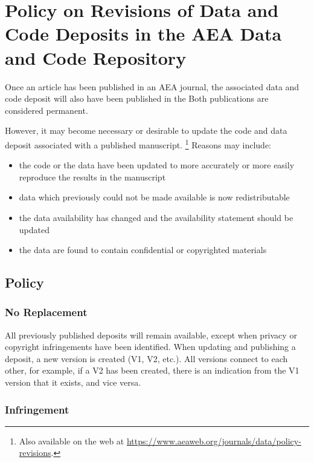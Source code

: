 \section{Policy on Revisions of Data and Code Deposits in the AEA Data and Code Repository}\label{policy-on-revisions-of-data-and-code-deposits-in-the-aea-data-and-code-repository}

Once an article has been published in an AEA journal, the associated
data and code deposit will also have been published in the
 Both publications are considered permanent.

However, it may become necessary or desirable to update the code and
data deposit associated with a published manuscript.%
\footnote{Also available on the web at \url{https://www.aeaweb.org/journals/data/policy-revisions}.} 
Reasons may
include:

\begin{itemize}
\tightlist
\item
  the code or the data have been updated to more accurately or more
  easily reproduce the results in the manuscript
\item
  data which previously could not be made available is now
  redistributable
\item
  the data availability has changed and the availability statement
  should be updated
\item
  the data are found to contain confidential or copyrighted materials
\end{itemize}

\subsection{Policy}\label{policy}

\subsubsection{No Replacement}\label{no-replacement}

All previously published deposits will remain available, except when
privacy or copyright infringements have been identified. When updating
and publishing a deposit, a new version is created (V1, V2, etc.). All
versions connect to each other, for example, if a V2 has been created,
there is an indication from the V1 version that it exists, and vice
versa.

\subsubsection{Infringement}\label{infringement}

